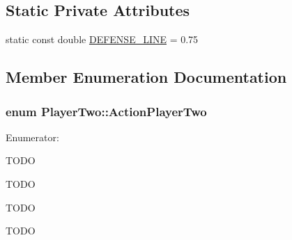 \subsection*{Static Private Attributes}
\begin{DoxyCompactItemize}
\item 
static const double \hyperlink{classPlayerTwo_a86e1752bf84fab5d093f93633d3e51da}{DEFENSE\_\-LINE} = 0.75
\end{DoxyCompactItemize}


\subsection{Member Enumeration Documentation}
\hypertarget{classPlayerTwo_a6dd2b1afb179fe02b677dd71ec5703d2}{
\subsubsection[{ActionPlayerTwo}]{\setlength{\rightskip}{0pt plus 5cm}enum {\bf PlayerTwo::ActionPlayerTwo}}}
\label{classPlayerTwo_a6dd2b1afb179fe02b677dd71ec5703d2}
\begin{Desc}
\item[Enumerator: ]\par
\begin{description}
\item[{\em 
\hypertarget{classPlayerTwo_a6dd2b1afb179fe02b677dd71ec5703d2a1ee0927d53a79a9c07f3e8347b65ec6e}{
GO\_\-TO\_\-DEF\_\-POS}
\label{classPlayerTwo_a6dd2b1afb179fe02b677dd71ec5703d2a1ee0927d53a79a9c07f3e8347b65ec6e}
}]TODO \item[{\em 
\hypertarget{classPlayerTwo_a6dd2b1afb179fe02b677dd71ec5703d2abd5fef2f14d18f78f33c6e946f1c9cd7}{
FOLLOWPATH}
\label{classPlayerTwo_a6dd2b1afb179fe02b677dd71ec5703d2abd5fef2f14d18f78f33c6e946f1c9cd7}
}]TODO \item[{\em 
\hypertarget{classPlayerTwo_a6dd2b1afb179fe02b677dd71ec5703d2aebb0cbac0bcb8fb7439a980dcc792638}{
STOP}
\label{classPlayerTwo_a6dd2b1afb179fe02b677dd71ec5703d2aebb0cbac0bcb8fb7439a980dcc792638}
}]TODO \item[{\em 
\hypertarget{classPlayerTwo_a6dd2b1afb179fe02b677dd71ec5703d2a891b5407c8423ecb7d65df3a7da9b334}{
DEFENSE}
\label{classPlayerTwo_a6dd2b1afb179fe02b677dd71ec5703d2a891b5407c8423ecb7d65df3a7da9b334}
}]TODO \end{description}
\end{Desc}



